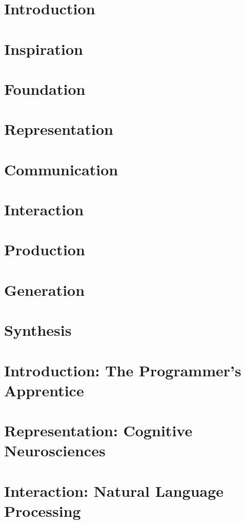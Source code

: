 
\section{Introduction}
\section{Inspiration}
\section{Foundation}
\section{Representation}
\section{Communication}
\section{Interaction}
\section{Production}
\section{Generation}
\section{Synthesis}


\section{Introduction: The Programmer's Apprentice}  %
\section{Representation: Cognitive Neurosciences}    %
\section{Interaction: Natural Language Processing}    %
